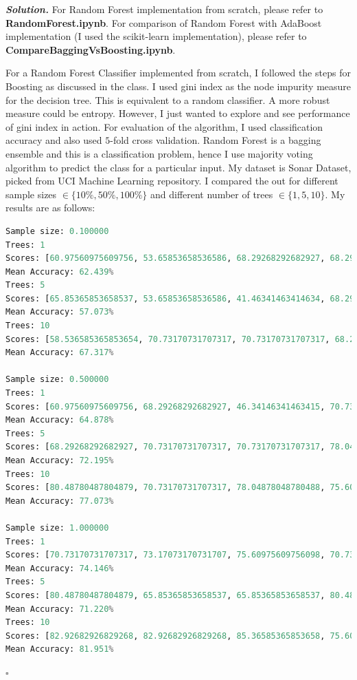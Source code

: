 \documentclass[12pt]{article}
\newenvironment{solution}[1][\it{Solution}]{\textbf{#1. } }{$\square$}
\begin{document}
\begin{solution}
For Random Forest implementation from scratch, please refer to \textbf{RandomForest.ipynb}. For comparison of Random Forest with AdaBoost implementation (I used the scikit-learn implementation), please refer to \textbf{CompareBaggingVsBoosting.ipynb}.

For a Random Forest Classifier implemented from scratch, I followed the steps for Boosting as discussed in the class. I used gini index as the node impurity measure for the decision tree. This is equivalent to a random classifier. A more robust measure could be entropy. However, I just wanted to explore and see performance of gini index in action. For evaluation of the algorithm, I used classification accuracy and also used $5$-fold cross validation. Random Forest is a bagging ensemble and this is a classification problem, hence I use majority voting algorithm to predict the class for a particular input. My dataset is Sonar Dataset\cite{sonar}, picked from UCI Machine Learning repository\cite{uci}. I compared the out for different sample sizes $\in \{10 \%, 50 \%, 100 \%\}$ and different number of trees $\in \{1 , 5, 10\}$. My results are as follows:

\begin{lstlisting}[language=Python]
Sample size: 0.100000
Trees: 1
Scores: [60.97560975609756, 53.65853658536586, 68.29268292682927, 68.29268292682927, 60.97560975609756]
Mean Accuracy: 62.439%
Trees: 5
Scores: [65.85365853658537, 53.65853658536586, 41.46341463414634, 68.29268292682927, 56.09756097560976]
Mean Accuracy: 57.073%
Trees: 10
Scores: [58.536585365853654, 70.73170731707317, 70.73170731707317, 68.29268292682927, 68.29268292682927]
Mean Accuracy: 67.317%

Sample size: 0.500000
Trees: 1
Scores: [60.97560975609756, 68.29268292682927, 46.34146341463415, 70.73170731707317, 78.04878048780488]
Mean Accuracy: 64.878%
Trees: 5
Scores: [68.29268292682927, 70.73170731707317, 70.73170731707317, 78.04878048780488, 73.17073170731707]
Mean Accuracy: 72.195%
Trees: 10
Scores: [80.48780487804879, 70.73170731707317, 78.04878048780488, 75.60975609756098, 80.48780487804879]
Mean Accuracy: 77.073%

Sample size: 1.000000
Trees: 1
Scores: [70.73170731707317, 73.17073170731707, 75.60975609756098, 70.73170731707317, 80.48780487804879]
Mean Accuracy: 74.146%
Trees: 5
Scores: [80.48780487804879, 65.85365853658537, 65.85365853658537, 80.48780487804879, 63.41463414634146]
Mean Accuracy: 71.220%
Trees: 10
Scores: [82.92682926829268, 82.92682926829268, 85.36585365853658, 75.60975609756098, 82.92682926829268]
Mean Accuracy: 81.951%
\end{lstlisting}


\end{solution}
\end{document}

